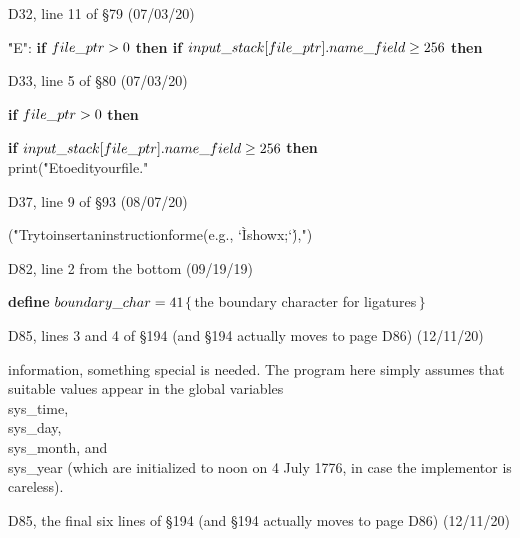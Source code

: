 \bugonpage D32, line 11 of \S79 (07/03/20)

\ninepoint\noindent\quad
\.{"E"}: {\bf if} $\\{file\_ptr}>0$ {\bf then if}
 $\\{input\_stack}[\\{file\_ptr}].\\{name\_field}\ge256$ {\bf then}

\bugonpage D33, line 5 of \S80 (07/03/20)

\ninepoint\noindent\quad
{\bf if} $\\{file\_ptr}>0$ {\bf then}\par
\noindent\qquad
{\bf if} $\\{input\_stack}[\\{file\_ptr}].\\{name\_field}\ge256$ {\bf then}
\\{print}(\.{"E\]to\]edit\]your\]file."}

\bugonpage D37, line 9 of \S93 (08/07/20)

\ninepoint\noindent\qquad
(\.{"Try\]to\]insert\]an\]instruction\]for\]me\](e.g.,\]%
        \char`\`I\]show\]x;\char`\'),"})

\bugonpage D82, line 2 from the bottom (09/19/19)

\ninepoint\noindent\quad
{\bf define} $\\{boundary\_char}=41$\quad$\{\,$the boundary character for ligatures$\,\}$

\bugonpage D85, lines 3 and 4 of \S194 {(and \S194 actually moves to page D86)} (12/11/20)

\tenpoint\noindent
information, something special
is needed. The program here simply assumes that suitable values appear in
the global variables \\{sys\_time}, \\{sys\_day}, \\{sys\_month}, and
\\{sys\_year} (which are initialized to noon on 4 July 1776,
in case the implementor is careless).

\bugonpage D85, the final six lines of \S194 {(and \S194 actually moves to page D86)} (12/11/20)

